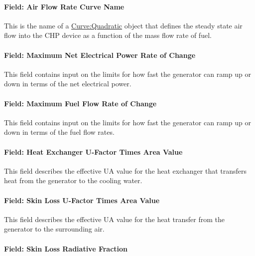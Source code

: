 \paragraph{Field: Air Flow Rate Curve Name}\label{field-air-flow-rate-curve-name}

This is the name of a \hyperref[curvequadratic]{Curve:Quadratic} object that defines the steady state air flow into the CHP device as a function of the mass flow rate of fuel.

\paragraph{Field: Maximum Net Electrical Power Rate of Change}\label{field-maximum-net-electrical-power-rate-of-change}

This field contains input on the limits for how fast the generator can ramp up or down in terms of the net electrical power.

\paragraph{Field: Maximum Fuel Flow Rate of Change}\label{field-maximum-fuel-flow-rate-of-change}

This field contains input on the limits for how fast the generator can ramp up or down in terms of the fuel flow rates.

\paragraph{Field: Heat Exchanger U-Factor Times Area Value}\label{field-heat-exchanger-u-factor-times-area-value-000}

This field describes the effective UA value for the heat exchanger that transfers heat from the generator to the cooling water.

\paragraph{Field: Skin Loss U-Factor Times Area Value}\label{field-skin-loss-u-factor-times-area-value}

This field describes the effective UA value for the heat transfer from the generator to the surrounding air.

\paragraph{Field: Skin Loss Radiative Fraction}\label{field-skin-loss-radiative-fraction}

